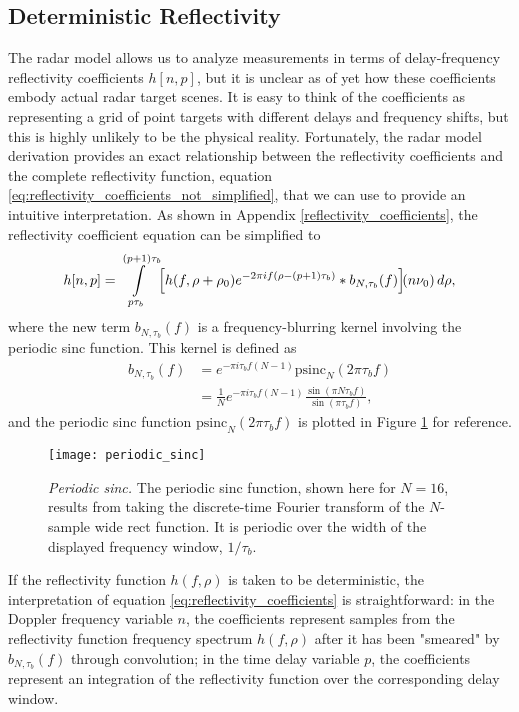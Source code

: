 \subsection{Deterministic Reflectivity}
The radar model allows us to analyze measurements in terms of delay-frequency reflectivity coefficients $h[n,p]$, but it is unclear as of yet how these coefficients embody actual radar target scenes. It is easy to think of the coefficients as representing a grid of point targets with different delays and frequency shifts, but this is highly unlikely to be the physical reality. Fortunately, the radar model derivation provides an exact relationship between the reflectivity coefficients and the complete reflectivity function, equation \eqref{eq:reflectivity_coefficients_not_simplified}, that we can use to provide an intuitive interpretation. As shown in Appendix \ref{reflectivity_coefficients}, the reflectivity coefficient equation can be simplified to
\begin{align}\label{eq:reflectivity_coefficients}
 h[n,p] = \int\limits_{p\tau_b}^{(p+1)\tau_b} \brak*{h(f, \rho + \rho_0) e^{-2\pi i f (\rho - (p+1)\tau_b)} * b_{N,\tau_b}(f)}\!(n\nu_0) \dee\rho,
\end{align}
where the new term $b_{N,\tau_b}(f)$ is a frequency-blurring kernel involving the periodic sinc function. This kernel is defined as
\begin{align}
 b_{N,\tau_b}(f) &= e^{-\pi i \tau_b f (N-1)} \mathrm{psinc}_N(2\pi \tau_b f)\\
 &= \frac{1}{N} e^{-\pi i \tau_b f (N-1)} \frac{\sin(\pi N \tau_b f)}{\sin(\pi \tau_b f)},
\end{align}
and the periodic sinc function $\mathrm{psinc}_N(2\pi \tau_b f)$ is plotted in Figure \ref{fig:periodic_sinc} for reference.
\begin{figure}[tpb]
 \centering
 \texttt{[image: periodic\_sinc]}
 \caption[Periodic sinc]{\emph{Periodic sinc.} The periodic sinc function, shown here for $N=16$, results from taking the discrete-time Fourier transform of the $N$-sample wide rect function. It is periodic over the width of the displayed frequency window, $1/\tau_b$.}
 \label{fig:periodic_sinc}
\end{figure}%
If the reflectivity function $h(f, \rho)$ is taken to be deterministic, the interpretation of equation \eqref{eq:reflectivity_coefficients} is straightforward: in the Doppler frequency variable $n$, the coefficients represent samples from the reflectivity function frequency spectrum $h(f, \rho)$ after it has been "smeared" by $b_{N,\tau_b}(f)$ through convolution; in the time delay variable $p$, the coefficients represent an integration of the reflectivity function over the corresponding delay window.


